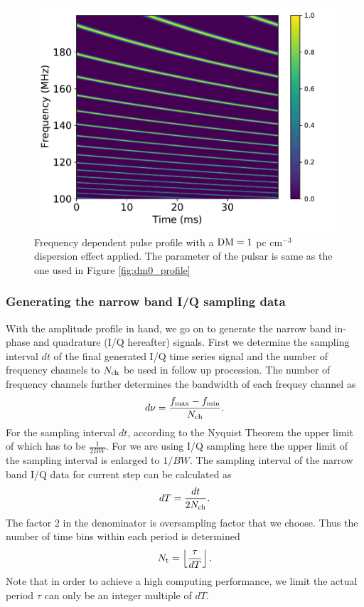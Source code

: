 \documentclass[fleqn,usenatbib]{mnras}
\begin{document}
 \begin{figure}
    \centering
    \includegraphics[width=0.9\columnwidth]{dm1_profile.pdf}
    \caption{Frequency dependent pulse profile with a $\rm DM=1$ pc cm$^{-3}$ dispersion effect applied. The parameter of the pulsar
    is same as the one used in Figure \ref{fig:dm0_profile}}
    \label{fig:dm1_profile}
 \end{figure}

\subsubsection{Generating the narrow band I/Q sampling data}
 
With the amplitude profile in hand, we go on to generate the narrow band in-phase and quadrature (I/Q hereafter) signals.
First we determine the sampling interval $dt$ of the final generated I/Q time series signal and the number of frequency channels to $N_{\rm ch}$ be used in follow up procession.
The number of frequency channels further determines the bandwidth of each frequey channel as
\begin{gather}
    d\nu=\frac{f_{\max}-f_{\min}}{N_{\rm ch}}.
\end{gather}
For the sampling interval $dt$, according to the Nyquist Theorem the upper limit of which has to be $\frac{1}{2BW}$. 
For we are using I/Q sampling here the upper limit of the sampling interval is enlarged to $1/BW$.
The sampling interval of the narrow band I/Q data for current step can be calculated as
\begin{gather}
 dT=\frac{dt}{2N_{\rm ch}}.
\end{gather}
The factor 2 in the denominator is oversampling factor that we choose.
Thus the number of time bins within each period is determined 
\begin{gather}
 N_{\rm t}=\left\lfloor\frac{\tau}{dT}\right\rfloor.
\end{gather}
Note that in order to achieve a high computing performance, we limit the actual period $\tau$ can only be an integer multiple of $dT$.
\end{document}
